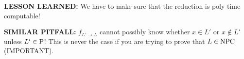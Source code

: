 \textbf{LESSON LEARNED:} We have to make sure that the reduction is poly-time computable!

\textbf{SIMILAR PITFALL:} $f_{L'\to L}$ cannot possibly know whether $x\in L'$ or $x\notin L'$ unless $L'\in\mathrm{P}$! This is never the case if you are trying to prove that $L\in\mathrm{NPC}$ (IMPORTANT).

